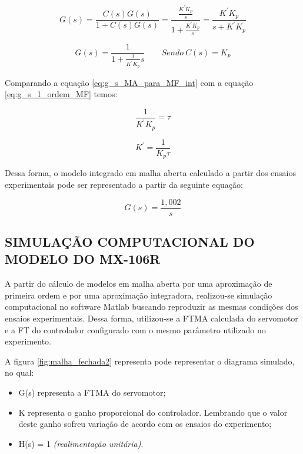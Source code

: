 \documentclass[12pt,oneside,a4paper, chapter=TITLE, section = TITLE, english, brazil]{abntex2}
\begin{document}
$$G(s) = \frac{C(s)G(s)}{1 + C(s)G(s)} = \frac{\frac{K^{'} K_{p}}{s}}{1 + \frac{K^{'} K_{p}}{s}} = \frac{K^{'} K_{p}}{s +  K^{'} K_{p}}$$

\begin{equation}
G(s) = \frac{1}{1 + \frac{1}{K^{'} K_{p}} s} \label{eq:g_s_MA_para_MF_int} \qquad Sendo \ C(s) = K_{p}
\end{equation}

Comparando a equação \ref{eq:g_s_MA_para_MF_int} com a equação \ref{eq:g_s_1_ordem_MF} temos:

$$ \frac{1}{K^{'} K_{p}} = \tau $$

\begin{equation}
K^{'} = \frac{1}{K_{p} \tau}
\end{equation}

Dessa forma, o modelo integrado em malha aberta calculado a partir dos ensaios experimentais pode ser representado a partir da seguinte equação:

$$ G(s) = \frac{1,002}{s} $$

\subsection{SIMULAÇÃO COMPUTACIONAL DO MODELO DO MX-106R} %

A partir do cálculo de modelos em malha aberta por uma aproximação de primeira ordem e por uma aproximação integradora, realizou-se simulação computacional no software Matlab buscando reproduzir as mesmas condições dos ensaios experimentais. Dessa forma, utilizou-se a FTMA calculada do servomotor e a FT do controlador configurado com o mesmo parâmetro utilizado no experimento.

A figura \ref{fig:malha_fechada2} representa pode representar o diagrama simulado, no qual:

\begin{itemize}

\item G(s) representa a FTMA do servomotor;

\item K representa o ganho proporcional do controlador. Lembrando que o valor deste ganho sofreu variação de acordo com os ensaios do experimento;

\item H(s) = 1 \textit{(realimentação unitária)}.
\\

\end{itemize}
\end{document}
